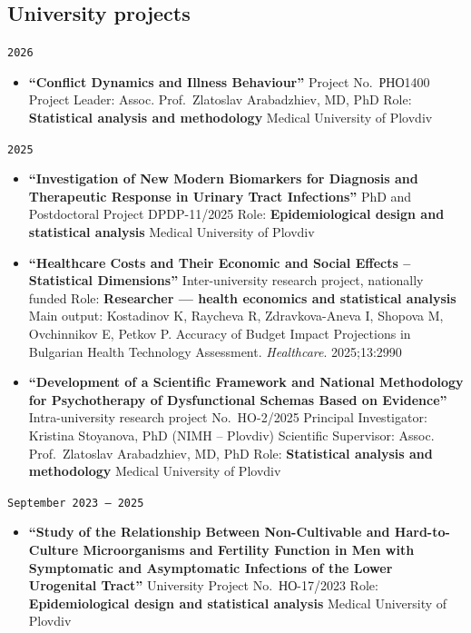 \documentclass[
  10.5pt,
  a4paper,
  DIV=11,
  numbers=noendperiod]{scrartcl}
\providecommand{\tightlist}{%
  \setlength{\itemsep}{0pt}\setlength{\parskip}{0pt}}
\let\oldtexttt\texttt
\renewcommand{\texttt}[1]{{\color{cvbronze}\small\oldtexttt{#1}}}
\begin{document}
\subsection{University projects}\label{university-projects}

\texttt{2026}

\begin{itemize}
\tightlist
\item
  \textbf{``Conflict Dynamics and Illness Behaviour''} \textbar{}
  Project No.~РНО1400 \textbar{} Project Leader: Assoc. Prof.~Zlatoslav
  Arabadzhiev, MD, PhD \textbar{} Role: \textbf{Statistical analysis and
  methodology} \textbar{} Medical University of Plovdiv
\end{itemize}

\texttt{2025}

\begin{itemize}
\tightlist
\item
  \textbf{``Investigation of New Modern Biomarkers for Diagnosis and
  Therapeutic Response in Urinary Tract Infections''} \textbar{} PhD and
  Postdoctoral Project DPDP-11/2025 \textbar{} Role:
  \textbf{Epidemiological design and statistical analysis} \textbar{}
  Medical University of Plovdiv
\item
  \textbf{``Healthcare Costs and Their Economic and Social Effects --
  Statistical Dimensions''} \textbar{} Inter-university research
  project, nationally funded \textbar{} Role: \textbf{Researcher ---
  health economics and statistical analysis} \textbar{} Main output:
  Kostadinov K, Raycheva R, Zdravkova-Aneva I, Shopova M, Ovchinnikov E,
  Petkov P. Accuracy of Budget Impact Projections in Bulgarian Health
  Technology Assessment. \emph{Healthcare}. 2025;13:2990
\item
  \textbf{``Development of a Scientific Framework and National
  Methodology for Psychotherapy of Dysfunctional Schemas Based on
  Evidence''} \textbar{} Intra-university research project No.~HO-2/2025
  \textbar{} Principal Investigator: Kristina Stoyanova, PhD (NIMH --
  Plovdiv) \textbar{} Scientific Supervisor: Assoc. Prof.~Zlatoslav
  Arabadzhiev, MD, PhD \textbar{} Role: \textbf{Statistical analysis and
  methodology} \textbar{} Medical University of Plovdiv
\end{itemize}

\texttt{September\ 2023\ –\ 2025}

\begin{itemize}
\tightlist
\item
  \textbf{``Study of the Relationship Between Non-Cultivable and
  Hard-to-Culture Microorganisms and Fertility Function in Men with
  Symptomatic and Asymptomatic Infections of the Lower Urogenital
  Tract''} \textbar{} University Project No.~НО-17/2023 \textbar{} Role:
  \textbf{Epidemiological design and statistical analysis} \textbar{}
  Medical University of Plovdiv
\end{itemize}
\end{document}
